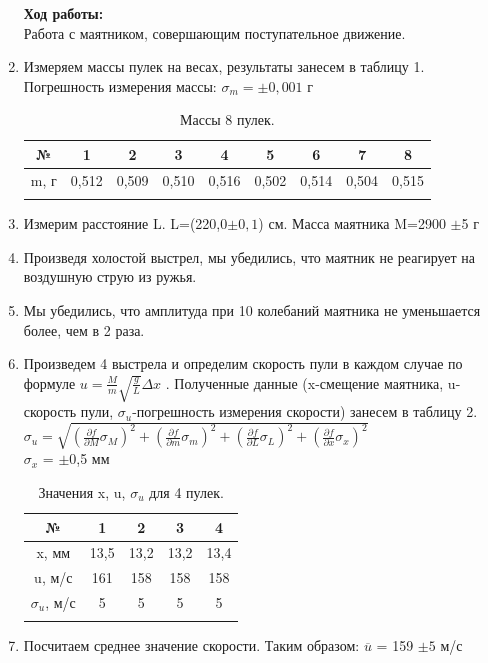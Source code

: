 \documentclass[a4paper, 12pt]{article}%
\begin{document}
	\begin{enumerate}
	\textbf{Ход работы:} \\
	Работа с маятником, совершающим поступательное движение.
	\item Измеряем массы пулек на весах, результаты занесем в таблицу 1. Погрешность измерения массы: $\sigma_m = \pm0,001 \text{ г}$ 
	
		\begin{longtable}{|c|c|c|c|c|c|c|c|c|}
		\hline 
		№ & 1 & 2& 3 & 4 & 5 & 6 & 7 & 8 \\
		\hline
		m, г& 0,512& 0,509& 0,510& 0,516 & 0,502 & 0,514 & 0,504 & 0,515\\
		\hline
		\caption{Массы 8 пулек.}
	\end{longtable}

	\item Измерим расстояние L. L=(220,0$\pm0,1$) см. Масса маятника M=2900 $\pm$5 г
	\item Произведя холостой выстрел, мы убедились, что маятник не реагирует на воздушную струю из ружья.
	\item Мы убедились, что амплитуда при 10 колебаний маятника не уменьшается более, чем в 2 раза.
	\item Произведем 4 выстрела и определим скорость пули в каждом случае по формуле $ u=\frac{M}{m} \sqrt{\frac{g}{L}} \Delta x $ . Полученные данные (x-смещение маятника, u-скорость пули, $\sigma_u$-погрешность измерения скорости) занесем в таблицу 2. \\
	 $\sigma_u = \sqrt{(\frac{\partial f}{\partial M}\sigma_M)^2 + (\frac{\partial f}{\partial m}\sigma_m)^2 + (\frac{\partial f}{\partial L}\sigma_L)^2+(\frac{\partial f}{\partial x}\sigma_x)^2 }$ \\
	  $\sigma_x$  = $\pm$0,5 мм
	 
	 	\begin{longtable}{|c|c|c|c|c|}
	 	\hline 
	 	№ & 1 & 2 & 3 & 4 \\
	 	\hline
	 	x, мм &13,5 &13,2 &13,2  &13,4 \\
	 	\hline
	 	u, м/с &161 & 158 & 158 & 158\\
	 	\hline 
	 	$\sigma_u$, м/с &5 &5 &5 &5 \\
	 	\hline 
	 	\caption{Значения x, u, $\sigma_u$ для 4 пулек. }
	 \end{longtable}
 
 
	\item Посчитаем среднее значение скорости. Таким образом: $\overline{u}$ = 159 $\pm 5$ м/с
\end{enumerate}
	
\end{document}
